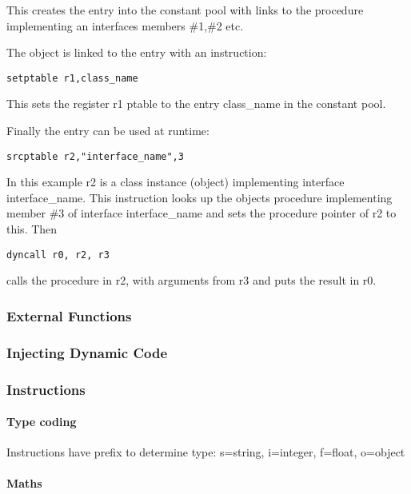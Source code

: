 This creates the entry into the constant pool with links to the procedure implementing an interfaces members \#1,\#2 etc.

The object is linked to the entry with an instruction:

\begin{verbatim}
setptable r1,class_name
\end{verbatim}

This sets the register r1 ptable to the entry \textquotedbl{}class\_name\textquotedbl{} in the constant pool.

Finally the entry can be used at runtime:

\begin{verbatim}
srcptable r2,"interface_name",3
\end{verbatim}

In this example r2 is a class instance (object) implementing interface \textquotedbl{}interface\_name\textquotedbl{}. This instruction looks up the object\textquotesingle{}s procedure implementing member \#3 of interface \textquotedbl{}interface\_name\textquotedbl{} and sets the procedure pointer of r2 to this. Then

\begin{verbatim}
dyncall r0, r2, r3
\end{verbatim}

calls the procedure in r2, with arguments from r3 and puts the result in r0.

\subsubsection{External Functions}

\subsubsection{Injecting Dynamic Code}

\subsubsection{Instructions}

\paragraph{Type coding}

Instructions have prefix to determine type: s=string, i=integer, f=float, o=object

\paragraph{Maths}

